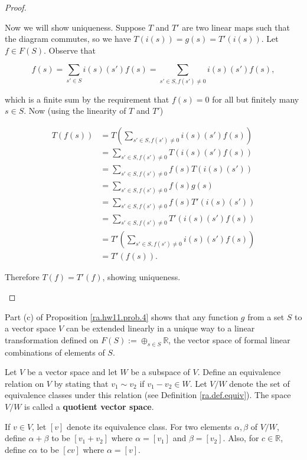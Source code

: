 \begin{proof}
\begin{enumerate}[(a)]
Now we will show uniqueness. Suppose \(T\) and \(T'\) are two linear maps such that the diagram commutes, so we have \(T(i(s)) = g(s) = T'(i(s))\). Let \(f \in F(S)\). Observe that

\[
f(s) = \sum_{s' \in S} i(s)(s') f(s) = \sum_{s' \in S, f(s') \neq 0} i(s)(s') f(s) ,
\]

which is a finite sum by the requirement that \(f(s) = 0\) for all but finitely many \(s \in S\). Now (using the linearity of \(T\) and \(T'\))

\begin{align*}
T(f(s)) & = T \left( \sum_{s' \in S, f(s') \neq 0} i(s)(s') f(s) \right) 
\\ & = \sum_{s' \in S, f(s') \neq 0} T \left(  i(s)(s') f(s) \right) 
\\ & = \sum_{s' \in S, f(s') \neq 0} f(s) T \left(  i(s)(s')  \right)
\\ & = \sum_{s' \in S, f(s') \neq 0} f(s) g(s) 
\\ & = \sum_{s' \in S, f(s') \neq 0} f(s) T' \left(  i(s)(s')  \right)
\\ & = \sum_{s' \in S, f(s') \neq 0} T' \left(  i(s)(s') f(s) \right) 
\\ & = T' \left( \sum_{s' \in S, f(s') \neq 0} i(s)(s') f(s) \right) 
\\ & = T'(f(s)).
\end{align*}


Therefore \(T(f) = T'(f)\), showing uniqueness.

\end{enumerate}

\end{proof}

Part (c) of Proposition \ref{ra.hw11.prob.4} shows that any function \(g\) from a set \(S\) to a vector space \(V\) can be extended linearly in a unique way to a linear transformation defined on \(F(S) := \oplus_{s \in S} \mathbb{R}\), the vector space of formal linear combinations of elements of \(S\).

\begin{definition}\label{ra.def.quot.vect}

Let \(V\) be a vector space and let \(W\) be a subspace of \(V\). Define an equivalence relation on \(V\) by stating that \(v_1 \sim v_2\) if \(v_1 - v_2 \in W\). Let \(V/W\) denote the set of equivalence classes under this relation (see Definition \ref{ra.def.equiv}). The space \(V/W\) is called a \textbf{quotient vector space}.

If \(v \in V\), let \([v]\) denote its equivalence class. For two elements \(\alpha, \beta\) of \(V/W\), define \(\alpha + \beta\) to be \([v_1 + v_2]\) where \(\alpha = [v_1]\) and \(\beta = [v_2]\). Also, for \(c \in \mathbb{R}\), define \(c \alpha\) to be \([cv]\) where \(\alpha = [v]\).

\end{definition}

